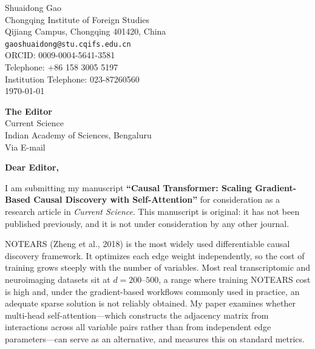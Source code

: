 \documentclass[12pt,a4paper]{article}
\begin{document}
\begin{flushright}
Shuaidong Gao\\
Chongqing Institute of Foreign Studies\\
Qijiang Campus, Chongqing 401420, China\\
\texttt{gaoshuaidong@stu.cqifs.edu.cn}\\
ORCID: 0009-0004-5641-3581\\
Telephone: +86 158 3005 5197\\
Institution Telephone: 023-87260560\\
\today
\end{flushright}

\vspace{1cm}

\noindent\textbf{The Editor}\\
Current Science\\
Indian Academy of Sciences, Bengaluru\\
Via E-mail

\vspace{0.6cm}

\noindent\textbf{Dear Editor,}

\vspace{0.3cm}

I am submitting my manuscript \textbf{``Causal Transformer: Scaling Gradient-Based Causal Discovery with Self-Attention''} for consideration as a research article in \textit{Current Science}. This manuscript is original: it has not been published previously, and it is not under consideration by any other journal.

\vspace{0.3cm}

NOTEARS (Zheng et al., 2018) is the most widely used differentiable causal discovery framework. It optimizes each edge weight independently, so the cost of training grows steeply with the number of variables. Most real transcriptomic and neuroimaging datasets sit at $d = 200$--$500$, a range where training NOTEARS cost is high and, under the gradient-based workflows commonly used in practice, an adequate sparse solution is not reliably obtained. My paper examines whether multi-head self-attention---which constructs the adjacency matrix from interactions across all variable pairs rather than from independent edge parameters---can serve as an alternative, and measures this on standard metrics.

\vspace{0.3cm}
\end{document}
